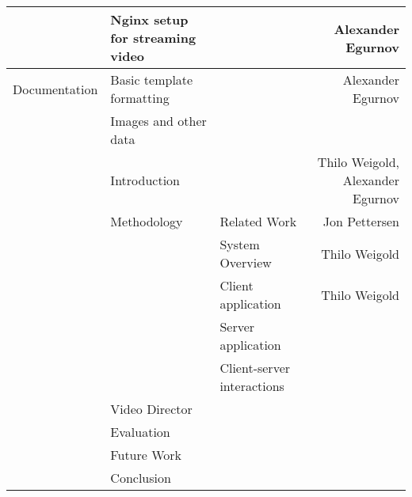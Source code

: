 \documentclass[conference]{IEEEtran}
\begin{document}
\begin{table*}[t]
\begin{tabular}{lllr}
			& Nginx setup for streaming video & & Alexander Egurnov \\
		\midrule
		Documentation 
			& Basic template formatting & & Alexander Egurnov \\
			& Images and other data & & \\
			& Introduction & & Thilo Weigold, Alexander Egurnov \\
			& Methodology & Related Work & Jon Pettersen \\
			&       & System Overview & Thilo Weigold \\
			&		& Client application & Thilo Weigold \\
			&		& Server application & \\
			&		& Client-server interactions & \\
			& Video Director & & \\
			& Evaluation & & \\
			& Future Work & & \\
			& Conclusion & & \\
		\bottomrule
    \end{tabular}%
\end{table*}%

\vfill
\end{document}
